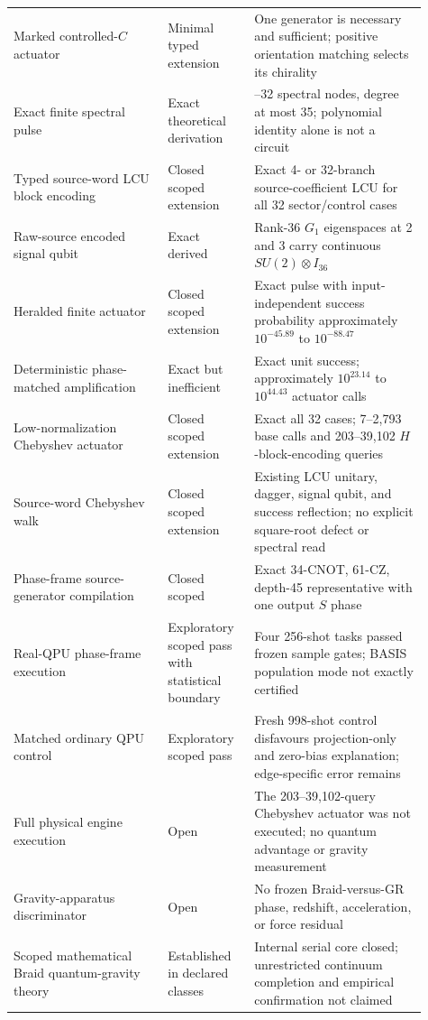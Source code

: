 \documentclass[11pt]{article}
\theoremstyle{definition}
\theoremstyle{remark}
\begin{document}
\begin{longtable}{>{\raggedright\arraybackslash}p{0.34\linewidth} >{\raggedright\arraybackslash}p{0.19\linewidth} >{\raggedright\arraybackslash}p{0.38\linewidth}}
Marked controlled-$C$ actuator & Minimal typed extension & One generator is necessary and sufficient; positive orientation matching selects its chirality \\
Exact finite spectral pulse & Exact theoretical derivation & 15--32 spectral nodes, degree at most 35; polynomial identity alone is not a circuit \\
Typed source-word LCU block encoding & Closed scoped extension & Exact 4- or 32-branch source-coefficient LCU for all 32 sector/control cases \\
Raw-source encoded signal qubit & Exact derived & Rank-36 $G_1$ eigenspaces at 2 and 3 carry continuous $SU(2)\otimes I_{36}$ \\
Heralded finite actuator & Closed scoped extension & Exact pulse with input-independent success probability approximately $10^{-45.89}$ to $10^{-88.47}$ \\
Deterministic phase-matched amplification & Exact but inefficient & Exact unit success; approximately $10^{23.14}$ to $10^{44.43}$ actuator calls \\
Low-normalization Chebyshev actuator & Closed scoped extension & Exact all 32 cases; 7--2,793 base calls and 203--39,102 $H$-block-encoding queries \\
Source-word Chebyshev walk & Closed scoped extension & Existing LCU unitary, dagger, signal qubit, and success reflection; no explicit square-root defect or spectral read \\
Phase-frame source-generator compilation & Closed scoped & Exact 34-CNOT, 61-CZ, depth-45 representative with one output $S$ phase \\
Real-QPU phase-frame execution & Exploratory scoped pass with statistical boundary & Four 256-shot tasks passed frozen sample gates; BASIS population mode not exactly certified \\
Matched ordinary QPU control & Exploratory scoped pass & Fresh 998-shot control disfavours projection-only and zero-bias explanation; edge-specific error remains \\
Full physical engine execution & Open & The 203--39,102-query Chebyshev actuator was not executed; no quantum advantage or gravity measurement \\
Gravity-apparatus discriminator & Open & No frozen Braid-versus-GR phase, redshift, acceleration, or force residual \\
Scoped mathematical Braid quantum-gravity theory & Established in declared classes & Internal serial core closed; unrestricted continuum completion and empirical confirmation not claimed \\

\end{longtable}
\end{document}
